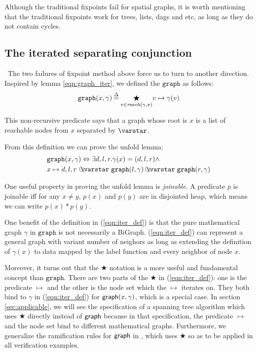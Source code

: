 Although the traditional fixpoints fail for spatial graphs, it is
worth mentioning that the traditional fixpoints work for trees, lists,
dags and etc, as long as they do not contain cycles.

\subsection{The iterated separating conjunction}\
The two failures of fixpoint method above force us to turn to another
direction. Inspired by lemma \ref{eqn:graph_iter}, we defined the
$\mathtt{graph}$ as follows:
\begin{equation}\label{eqn:iter_def}
  \mathtt{graph}(x, \gamma)\mathbin{\stackrel{\Delta}{=}}\underset{v\in\mathit{reach}(\gamma, x)}{\bigstar} v\mapsto\gamma(v)
\end{equation}

This non-recursive predicate says that a graph whose root is $x$ is a
list of reachable nodes from $x$ separated by $\scon$.

\label{sec:foldunfold} From this definition we can prove the unfold lemma:
\begin{equation}\label{eqn:unfold_graph}
  \begin{split}
  & \mathtt{graph}(x, \gamma) \Leftrightarrow \exists d,l,r
    . \gamma(x)=(d,l,r) \wedge \\ & x \mapsto d,l,r\, \ocon
    \mathtt{graph}(l, \gamma) \ocon \mathtt{graph}(r, \gamma)
  \end{split}
\end{equation}

One useful property in proving the unfold lemma is \emph{joinable}. A
predicate $p$ is joinable iff for any $x\neq y$, $p(x)$ and $p(y)$ are
in disjointed heap, which means we can write $p(x) * p(y)$.

One benefit of the definition in (\ref{eqn:iter_def}) is that the pure
mathematical graph $\gamma$ in $\mathtt{graph}$ is not necessarily a
BiGraph. (\ref{eqn:iter_def}) can represent a general graph with
variant number of neighors as long as extending the definition of
$\gamma(x)$ to data mapped by the label function and every neighbor of
node $x$.

Moreover, it turns out that the $\bigstar$ notation is a more useful
and fundamental concept than $\mathtt{graph}$. There are two parts of
the $\bigstar$ in (\ref{eqn:iter_def}): one is the predicate $\mapsto$
and the other is the node set which the $\mapsto$ iterates on. They
both bind to $\gamma$ in (\ref{eqn:iter_def}) for $\mathsf{graph}(x,
\gamma)$, which is a special case. In section \ref{sec:applicable}, we
will see the specification of a spanning tree algorithm which uses
$\bigstar$ directly instead of $\mathsf{graph}$ because in that
specification, the predicate $\mapsto$ and the node set bind to
different mathematical graphs. Furthermore, we generalize the
ramification rules for $\mathsf{graph}$ in \cite{hobor:ramification}, which
uses $\bigstar$ so as to be applied in all verification examples.

